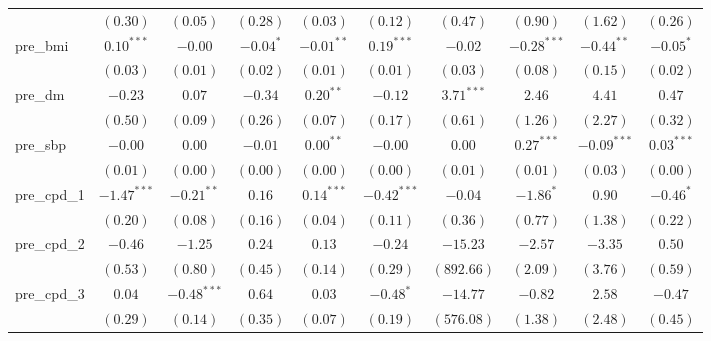 \begin{tabular}{l c c c c c c c c c}
                 & $(0.30)$      & $(0.05)$      & $(0.28)$      & $(0.03)$      & $(0.12)$      & $(0.47)$       & $(0.90)$      & $(1.62)$      & $(0.26)$       \\
pre\_bmi         & $0.10^{***}$  & $-0.00$       & $-0.04^{*}$   & $-0.01^{**}$  & $0.19^{***}$  & $-0.02$        & $-0.28^{***}$ & $-0.44^{**}$  & $-0.05^{*}$    \\
                 & $(0.03)$      & $(0.01)$      & $(0.02)$      & $(0.01)$      & $(0.01)$      & $(0.03)$       & $(0.08)$      & $(0.15)$      & $(0.02)$       \\
pre\_dm          & $-0.23$       & $0.07$        & $-0.34$       & $0.20^{**}$   & $-0.12$       & $3.71^{***}$   & $2.46$        & $4.41$        & $0.47$         \\
                 & $(0.50)$      & $(0.09)$      & $(0.26)$      & $(0.07)$      & $(0.17)$      & $(0.61)$       & $(1.26)$      & $(2.27)$      & $(0.32)$       \\
pre\_sbp         & $-0.00$       & $0.00$        & $-0.01$       & $0.00^{**}$   & $-0.00$       & $0.00$         & $0.27^{***}$  & $-0.09^{***}$ & $0.03^{***}$   \\
                 & $(0.01)$      & $(0.00)$      & $(0.00)$      & $(0.00)$      & $(0.00)$      & $(0.01)$       & $(0.01)$      & $(0.03)$      & $(0.00)$       \\
pre\_cpd\_1      & $-1.47^{***}$ & $-0.21^{**}$  & $0.16$        & $0.14^{***}$  & $-0.42^{***}$ & $-0.04$        & $-1.86^{*}$   & $0.90$        & $-0.46^{*}$    \\
                 & $(0.20)$      & $(0.08)$      & $(0.16)$      & $(0.04)$      & $(0.11)$      & $(0.36)$       & $(0.77)$      & $(1.38)$      & $(0.22)$       \\
pre\_cpd\_2      & $-0.46$       & $-1.25$       & $0.24$        & $0.13$        & $-0.24$       & $-15.23$       & $-2.57$       & $-3.35$       & $0.50$         \\
                 & $(0.53)$      & $(0.80)$      & $(0.45)$      & $(0.14)$      & $(0.29)$      & $(892.66)$     & $(2.09)$      & $(3.76)$      & $(0.59)$       \\
pre\_cpd\_3      & $0.04$        & $-0.48^{***}$ & $0.64$        & $0.03$        & $-0.48^{*}$   & $-14.77$       & $-0.82$       & $2.58$        & $-0.47$        \\
                 & $(0.29)$      & $(0.14)$      & $(0.35)$      & $(0.07)$      & $(0.19)$      & $(576.08)$     & $(1.38)$      & $(2.48)$      & $(0.45)$       \\

\end{tabular}

